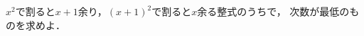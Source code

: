 \documentclass[../../main.tex]{subfiles}
\begin{document}
$x^2$で割ると$x+1$余り，${(x+1)}^2$で割ると$x$余る整式のうちで，
次数が最低のものを求めよ．
\end{document}
